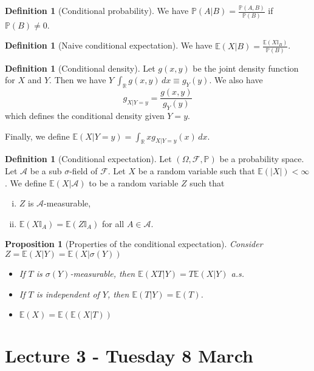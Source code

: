 \documentclass[10pt, oneside, reqno]{amsart}
\theoremstyle{plain}%
\newtheorem{prop}[thm]{Proposition}
\theoremstyle{definition}
\newtheorem{defn}[thm]{Definition}
\theoremstyle{remark}
\newcommand{\expc}[1]{\mathbb{E}\left(#1\right)}
\newcommand{\R}{\mathbb{R}}
\renewcommand{\P}{\mathbb{P}}
\newcommand{\E}{\mathbb{E}}
\begin{document}
\begin{defn}[Conditional probability]
    We have $\P( A | B) = \frac{\P(A, B)}{\P(B)}$ if $\P(B) \neq 0$.
\end{defn}

\begin{defn}[Naive conditional expectation]
    We have $\expc{X | B} = \frac{ \expc{ X \mathbb{I}_B}}{\P(B)}$.
\end{defn}

\begin{defn}[Conditional density]
    Let $g(x,y)$ be the joint density function for $X$ and $Y$.  Then we have $Y ~ \int_\R g(x,y)\, dx \equiv g_Y(y)$.  We also have \[
        g_{X|Y = y} = \frac{g(x,y)}{g_Y(y)}
    \] which defines the conditional density given $Y = y$.
    
    Finally, we define $\expc{ X |Y = y} = \int_\R x g_{X|Y = y}(x) \,dx$.
\end{defn}

\begin{defn}[Conditional expectation]
    Let $(\Omega, \mathcal{F}, \P)$ be a probability space.  Let $\mathcal{A}$ be a sub $\sigma$-field of $\mathcal{F}$.  Let $X$ be a random variable such that $\E(|X|) < \infty$.  We define $\expc{X | \mathcal{A}}$ to be a random variable $Z$ such that 
    \begin{enumerate}[(i)]
        \item $Z$ is $\mathcal{A}$-measurable,
        \item $\E(X\mathbb{I}_A) = \E(Z\mathbb{I}_A)$ for all $A \in \mathcal{A}$.
    \end{enumerate}
\end{defn}


\begin{prop}[Properties of the conditional expectation]
    Consider $Z = \E(X|Y) = \E(X|\sigma(Y))$
    \begin{itemize}
        \item If $T$ is $\sigma(Y)$-measurable, then $\E(XT|Y) = T\E(X|Y)$ a.s.
        \item If $T$ is independent of $Y$, then $\E(T|Y) = \E(T)$.
        \item $\E(X) = \E(\E(X|T))$
    \end{itemize}
\end{prop}


\section{Lecture 3 - Tuesday 8 March} %
\label{sec:lecture_3_tuesday_8_march}
\end{document}
